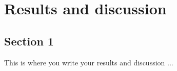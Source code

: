 \chapter{Results and discussion}  %

\section{Section 1} %

This is where you write your results and discussion ...